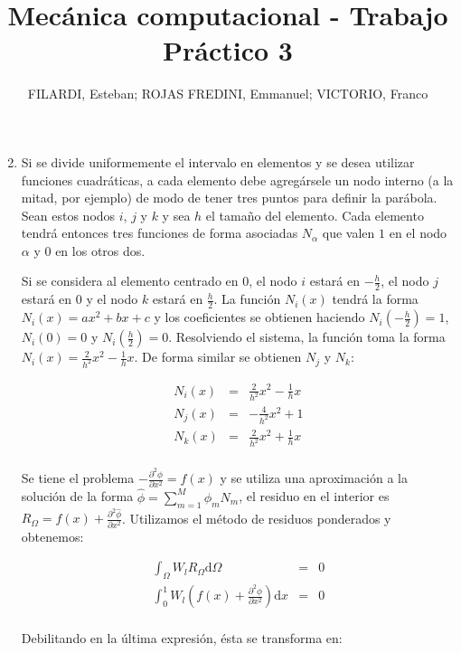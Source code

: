 \documentclass{article}
\title{\textbf{Mecánica computacional - Trabajo Práctico 3}}
\author{FILARDI, Esteban; ROJAS FREDINI, Emmanuel; VICTORIO, Franco}
\date{}
\def\intzeroone{\int_{0}^1}
\def\dx{\mbox{d}x}
\def\domega{\mbox{d}\Omega}
\def\summ{\sum_{m=1}^M}
\def\partialxx#1{\frac{\partial^2 #1}{\partial x^2}}
\def\hatphi{\hat{\phi}}
\begin{document}
\maketitle

\begin{enumerate}[1)]
    \setcounter{enumi}{1}
    \item{ %
        Si se divide uniformemente el intervalo en elementos y se desea utilizar funciones 
        cuadráticas, a cada elemento debe agregársele un nodo interno (a la mitad, por
        ejemplo) de modo de tener tres puntos para definir la parábola. Sean estos nodos
        $i$, $j$ y $k$ y sea $h$ el tamaño del elemento. Cada elemento tendrá entonces
        tres funciones de forma asociadas $N_\alpha$ que valen $1$ en el nodo $\alpha$
        y $0$ en los otros dos.

        Si se considera al elemento centrado en $0$, el nodo $i$ estará en $-\frac{h}{2}$,
        el nodo $j$ estará en $0$ y el nodo $k$ estará en $\frac{h}{2}$. La función
        $N_i(x)$ tendrá la forma $N_i(x) = a x^2 + b x + c$ y los coeficientes se
        obtienen haciendo $N_i(-\frac{h}{2}) = 1$, $N_i(0) = 0$ y $N_i(\frac{h}{2}) = 0$.
        Resolviendo el sistema, la función toma la forma $N_i(x) = \frac{2}{h^2} x^2
        - \frac{1}{h} x$. De forma similar se obtienen $N_j$ y $N_k$:

        \begin{eqnarray*}
            N_i(x) &=& \frac{2}{h^2} x^2 - \frac{1}{h} x \\
            N_j(x) &=& -\frac{4}{h^2} x^2 + 1 \\
            N_k(x) &=& \frac{2}{h^2} x^2 + \frac{1}{h} x \\
        \end{eqnarray*}

        Se tiene el problema $-\partialxx{\phi} = f(x)$ y se utiliza una aproximación
        a la solución de la forma $\hat{\phi} = \summ \phi_m N_m$, el residuo en el
        interior es $R_\Omega = f(x) + \partialxx{\hatphi}$. Utilizamos el método
        de residuos ponderados y obtenemos:

        \begin{eqnarray*}
            \int_\Omega W_l R_\Omega \domega &=& 0 \\
            \intzeroone W_l \left( f(x) + \partialxx{\hatphi} \right) \dx &=& 0 \\
        \end{eqnarray*}

        Debilitando en la última expresión, ésta se transforma en:

}
\end{enumerate}
\end{document}
